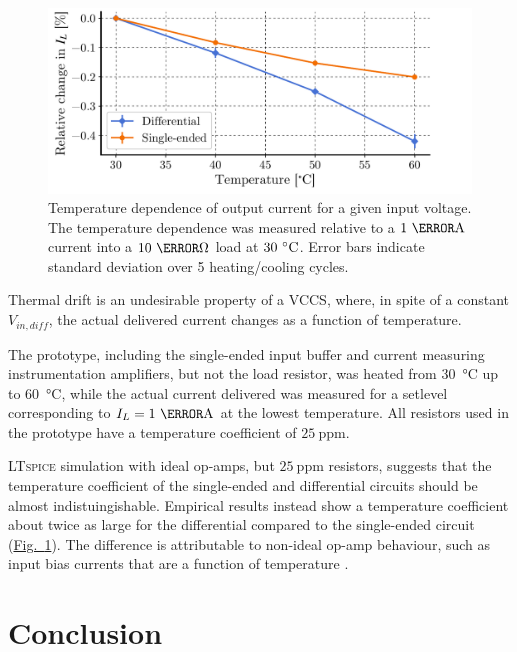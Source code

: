 \documentclass[10pt]{article}
\newcommand{\brieffiglink}[1]{\hyperref[#1]{Fig.~\ref*{#1}}}
\begin{document}
\begin{figure}[b!]
        \centering
        \includegraphics[scale=.6]{fig_temperature_coeff.pdf}
        \caption{\small Temperature dependence of output current for a given input voltage. The temperature dependence was measured relative to a $1~\milli\ampere$ current into a $10~\kilo\ohm$ load at $30~\celsius$. Error bars indicate standard deviation over 5 heating/cooling cycles.}
        \label{fig:temp_coeff}
\end{figure}

Thermal drift is an undesirable property of a VCCS, where, in spite of a constant $V_{in,diff}$, the actual delivered current changes as a function of temperature.

The prototype, including the single-ended input buffer and current measuring instrumentation amplifiers, but not the load resistor, was heated from \SI{30}{\celsius} up to \SI{60}{\celsius}, while the actual current delivered was measured for a setlevel corresponding to $I_L=1~\milli\ampere$ at the lowest temperature. All resistors used in the prototype have a temperature coefficient of $25~\text{ppm}$.

\textsc{LTspice} simulation with ideal op-amps, but $25~\text{ppm}$ resistors, suggests that the temperature coefficient of the single-ended and differential circuits should be almost indistuingishable. Empirical results instead show a temperature coefficient about twice as large for the differential compared to the single-ended circuit (\brieffiglink{fig:temp_coeff}). The difference is attributable to non-ideal op-amp behaviour, such as input bias currents that are a function of temperature \cite{LT1211_datasheet}.


\section{Conclusion}
\label{sec:conclusion}
\end{document}
